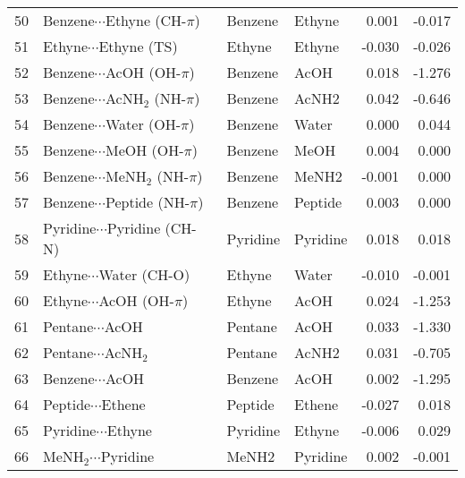 \begin{longtable}{llllrr}
50 & Benzene$\cdots$Ethyne (CH-$\pi$) & Benzene & Ethyne & 0.001 & -0.017 \\
51 & Ethyne$\cdots$Ethyne (TS) & Ethyne & Ethyne & -0.030 & -0.026 \\
52 & Benzene$\cdots$AcOH (OH-$\pi$) & Benzene & AcOH & 0.018 & -1.276 \\
53 & Benzene$\cdots$AcNH$_2$ (NH-$\pi$) & Benzene & AcNH2 & 0.042 & -0.646 \\
54 & Benzene$\cdots$Water (OH-$\pi$) & Benzene & Water & 0.000 & 0.044 \\
55 & Benzene$\cdots$MeOH (OH-$\pi$) & Benzene & MeOH & 0.004 & 0.000 \\
56 & Benzene$\cdots$MeNH$_2$ (NH-$\pi$) & Benzene & MeNH2 & -0.001 & 0.000 \\
57 & Benzene$\cdots$Peptide (NH-$\pi$) & Benzene & Peptide & 0.003 & 0.000 \\
58 & Pyridine$\cdots$Pyridine (CH-N) & Pyridine & Pyridine & 0.018 & 0.018 \\
59 & Ethyne$\cdots$Water (CH-O) & Ethyne & Water & -0.010 & -0.001 \\
60 & Ethyne$\cdots$AcOH (OH-$\pi$) & Ethyne & AcOH & 0.024 & -1.253 \\
61 & Pentane$\cdots$AcOH & Pentane & AcOH & 0.033 & -1.330 \\
62 & Pentane$\cdots$AcNH$_2$ & Pentane & AcNH2 & 0.031 & -0.705 \\
63 & Benzene$\cdots$AcOH & Benzene & AcOH & 0.002 & -1.295 \\
64 & Peptide$\cdots$Ethene & Peptide & Ethene & -0.027 & 0.018 \\
65 & Pyridine$\cdots$Ethyne & Pyridine & Ethyne & -0.006 & 0.029 \\
66 & MeNH$_2$$\cdots$Pyridine & MeNH2 & Pyridine & 0.002 & -0.001 \\
\end{longtable}